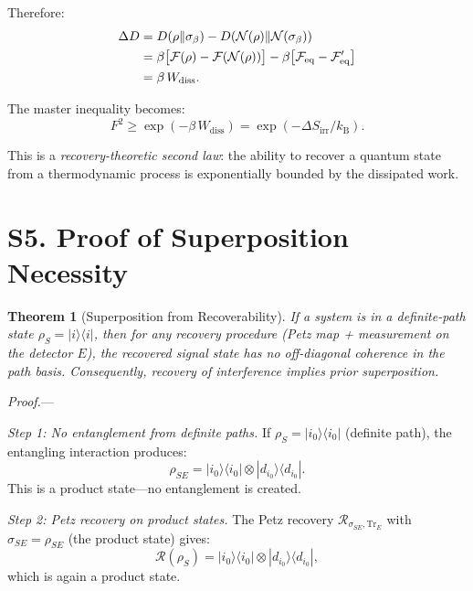 \documentclass[prl,twocolumn,superscriptaddress,longbibliography]{revtex4-2}
\newtheorem{theorem}{Theorem}
\newcommand{\kB}{k_{\mathrm{B}}}
\newcommand{\Tr}{\mathrm{Tr}}
\newcommand{\Petz}{\mathcal{R}}
\newcommand{\chan}{\mathcal{N}}
\newcommand{\ket}[1]{|#1\rangle}
\newcommand{\bra}[1]{\langle#1|}
\begin{document}
Therefore:
\begin{align}
\Delta D &= D(\rho\|\sigma_\beta) - D(\chan(\rho)\|\chan(\sigma_\beta))
\notag\\
&= \beta\big[\mathcal{F}(\rho) - \mathcal{F}(\chan(\rho))\big]
  - \beta\big[\mathcal{F}_{\mathrm{eq}} - \mathcal{F}'_{\mathrm{eq}}\big] \notag\\
&= \beta\, W_{\mathrm{diss}}.
\end{align}

The master inequality becomes:
\begin{equation}
\boxed{
F^2 \geq \exp(-\beta\, W_{\mathrm{diss}})
= \exp(-\Delta S_{\mathrm{irr}}/\kB).
}
\end{equation}

This is a \emph{recovery-theoretic second law}: the ability to recover
a quantum state from a thermodynamic process is exponentially bounded by
the dissipated work.

\section{S5. Proof of Superposition Necessity}
\label{sec:superposition}

\begin{theorem}[Superposition from Recoverability]
If a system is in a definite-path state $\rho_S = \ket{i}\bra{i}$, then
for any recovery procedure (Petz map + measurement on the detector $E$),
the recovered signal state has no off-diagonal coherence in the path
basis. Consequently, recovery of interference implies prior
superposition.
\end{theorem}

\emph{Proof.}---

\emph{Step 1: No entanglement from definite paths.}
If $\rho_S = \ket{i_0}\bra{i_0}$ (definite path), the entangling
interaction produces:
\begin{equation}
\rho_{SE} = \ket{i_0}\bra{i_0} \otimes \ket{d_{i_0}}\bra{d_{i_0}}.
\end{equation}
This is a product state---no entanglement is created.

\emph{Step 2: Petz recovery on product states.}
The Petz recovery $\Petz_{\sigma_{SE}, \Tr_E}$ with
$\sigma_{SE} = \rho_{SE}$ (the product state) gives:
\begin{equation}
\Petz(\rho_S) = \ket{i_0}\bra{i_0} \otimes \ket{d_{i_0}}\bra{d_{i_0}},
\end{equation}
which is again a product state.
\end{document}
